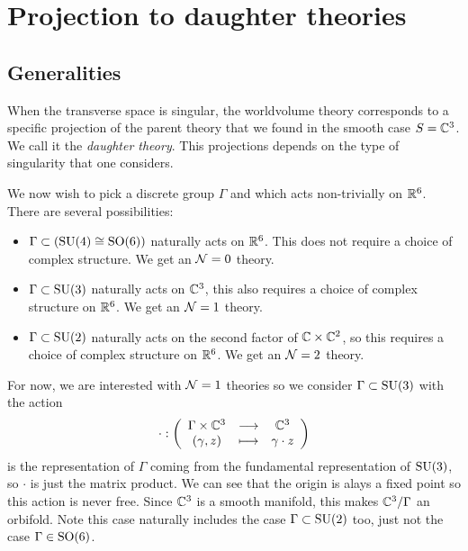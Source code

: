 \documentclass[a4paper,11pt]{article}
\begin{document}
\section{Projection to daughter theories}

    \subsection{Generalities}

        When the transverse space is singular, the worldvolume theory corresponds to a specific projection of the parent theory that we found in the smooth case $S=\mathbb{C}^3$. We call it the \emph{daughter theory}. This projections depends on the type of singularity that one considers.

        We now wish to pick a discrete group $\Gamma$ and which acts non-trivially on $\mathbb{R}^6$. There are several possibilities:
        \begin{itemize}
            \item $\Gamma\subset(\text{SU}(4)\cong\text{SO}(6))$ naturally acts on $\mathbb{R}^6$. This does not require a choice of complex structure. We get an $\mathcal{N}=0$ theory.
            \item $\Gamma\subset\text{SU}(3)$ naturally acts on $\mathbb{C}^3$, this also requires a choice of complex structure on $\mathbb{R}^6$. We get an $\mathcal{N}=1$ theory.
            \item $\Gamma\subset\text{SU}(2)$ naturally acts on the second factor of $\mathbb{C}\times\mathbb{C}^2$, so this requires a choice of complex structure on $\mathbb{R}^6$. We get an $\mathcal{N}=2$ theory.
        \end{itemize}

        For now, we are interested with $\mathcal{N}=1$ theories so we consider $\Gamma\subset\text{SU}(3)$ with the action
        \begin{equation}
            \cdot:\left(
            \begin{array}{ccc}
                \Gamma\times\mathbb{C}^3 & \longrightarrow & \mathbb{C}^3 \\
                (\gamma,z) & \longmapsto & \gamma\cdot z
            \end{array}
            \right)
        \end{equation}
        is the representation of $\Gamma$ coming from the fundamental representation of $\text{SU}(3)$, so $\cdot$ is just the matrix product. We can see that the origin is alays a fixed point so this action is never free. Since $\mathbb{C}^3$ is a smooth manifold, this makes $\mathbb{C}^3/\Gamma$ an orbifold. Note this case naturally includes the case $\Gamma\subset\text{SU}(2)$ too, just not the case $\Gamma\in\text{SO}(6)$.
\end{document}
